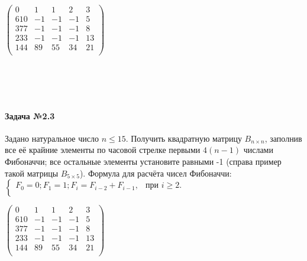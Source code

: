 \documentclass[12pt,a4paper]{report}
\begin{document}
\hfill
\begin{minipage}{0.24\textwidth}
$\begin{pmatrix}
0 & 1 & 1 & 2 & 3 \\
610 & -1 & -1 & -1 & 5 \\
377 & -1 & -1 & -1 & 8 \\
233 & -1 & -1 & -1 & 13 \\
144 & 89 & 55 & 34 & 21 \\
\end{pmatrix}$
\end{minipage}
\\ \\ \\
\noindent %
\begin{minipage}{0.75\textwidth}
\paragraph*{Задача №2.3}
Задано натуральное число $n \le 15$. Получить квадратную матрицу $B_{n \times n}$, заполнив все её крайние элементы по часовой стрелке первыми $4(n-1)$ числами Фибоначчи; все остальные элементы установите равными -1 (справа пример такой матрицы $B_{5 \times 5}$). Формула для расчёта чисел Фибоначчи: \\
$\begin{cases}
F_0 = 0; F_1 = 1; F_i = F_{i-2} + F_{i-1}, & \text{при } i \ge 2. \\
\end{cases}$
\end{minipage}
\hfill
\begin{minipage}{0.24\textwidth}
$\begin{pmatrix}
0 & 1 & 1 & 2 & 3 \\
610 & -1 & -1 & -1 & 5 \\
377 & -1 & -1 & -1 & 8 \\
233 & -1 & -1 & -1 & 13 \\
144 & 89 & 55 & 34 & 21 \\
\end{pmatrix}$
\end{minipage}
\end{document}
